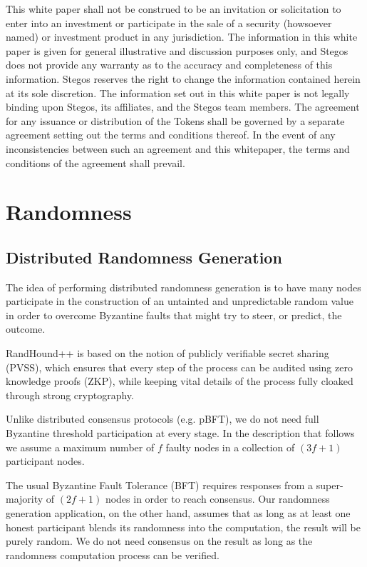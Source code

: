 \documentclass[8pt,fleqn,openany]{book}
\begin{document}
This white paper shall not be construed to be an invitation or solicitation to enter into an investment or participate in the sale of a security (howsoever named) or investment product in any jurisdiction. The information in this white paper is given for general illustrative and discussion purposes only, and Stegos does not provide any warranty as to the accuracy and completeness of this information. Stegos reserves the right to change the information contained herein at its sole discretion. The information set out in this white paper is not legally binding upon Stegos, its affiliates, and the Stegos team members. The agreement for any issuance or distribution of the Tokens shall be governed by a separate agreement setting out the terms and conditions thereof. In the event of any inconsistencies between such an agreement and this whitepaper, the terms and conditions of the agreement shall prevail. 

\newpage \appendix
{}

\chapter{Randomness}\label{app:randomness}

\section{Distributed Randomness Generation}
The idea of performing distributed randomness generation is to have many nodes participate in the construction of an untainted and unpredictable random value in order to overcome Byzantine faults that might try to steer, or predict, the outcome.

RandHound++ is based on the notion of publicly verifiable secret sharing (PVSS)\cite{c15}, which ensures that every step of the process can be audited using zero knowledge proofs (ZKP), while keeping vital details of the process fully cloaked through strong cryptography.

Unlike distributed consensus protocols (e.g. pBFT), we do not need full Byzantine threshold participation at every stage. In the description that follows we assume a maximum number of $f$ faulty nodes in a collection of $(3 f + 1)$ participant nodes. 

The usual Byzantine Fault Tolerance (BFT) requires responses from a super-majority of $(2 f + 1)$ nodes in order to reach consensus. Our randomness generation application, on the other hand, assumes that as long as at least one honest participant blends its randomness into the computation, the result will be purely random. We do not need consensus on the result as long as the randomness computation process can be verified.
\end{document}
